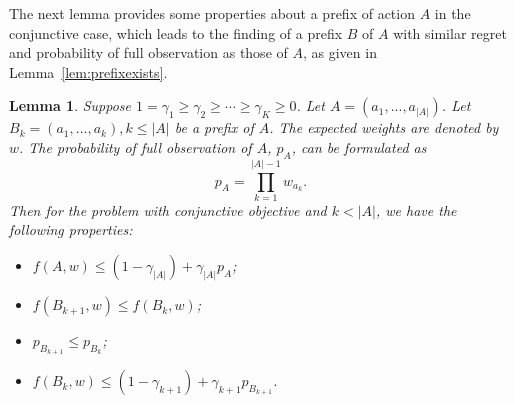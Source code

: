 \documentclass{article}
\newcommand{\abs}[1]{\left| #1 \right|}
\newtheorem{lemma}[theorem]{Lemma}%
\begin{document}
The next lemma provides some properties about a prefix of action $A$ in the conjunctive case, which leads to the finding of a prefix $B$ of $A$ with similar regret and probability of full observation as those of $A$, as given in Lemma~\ref{lem:prefixexists}.

\begin{lemma} %
	\label{lem:prefixRelation}
	Suppose $1 = \gamma_1 \geq \gamma_2 \geq \cdots \geq \gamma_K \geq 0$. Let $A = (a_1, ..., a_{\abs{A}})$. Let $B_k = (a_1, ..., a_k), k \leq \abs{A}$ be a prefix of $A$. The expected weights are denoted by $w$. The probability of full observation of $A$, $p_{A}$, can be formulated as
	$$
	p_{A} = \prod_{k=1}^{\abs{A}-1} w_{a_k}.
	$$
	Then for the problem with conjunctive objective and $k < \abs{A}$, we have the following properties:
	\begin{itemize}
		\item[(1)] $f(A, w) \leq (1-\gamma_{\abs{A}}) + \gamma_{\abs{A}} p_{A}$;
		\item[(2)] $f(B_{k+1}, w) \leq f(B_k, w)$;
		\item[(3)] $p_{B_{k+1}} \leq p_{B_k}$;
		\item[(4)] $f(B_k, w) \leq (1-\gamma_{k+1}) + \gamma_{k+1} p_{B_{k+1}}$.
	\end{itemize}
\end{lemma}
\end{document}
